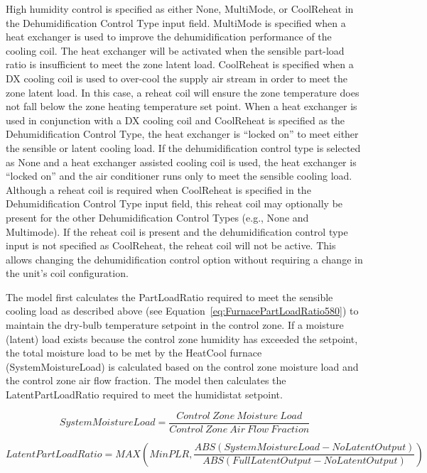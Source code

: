 High humidity control is specified as either None, MultiMode, or CoolReheat in the Dehumidification Control Type input field. MultiMode is specified when a heat exchanger is used to improve the dehumidification performance of the cooling coil. The heat exchanger will be activated when the sensible part-load ratio is insufficient to meet the zone latent load. CoolReheat is specified when a DX cooling coil is used to over-cool the supply air stream in order to meet the zone latent load. In this case, a reheat coil will ensure the zone temperature does not fall below the zone heating temperature set point. When a heat exchanger is used in conjunction with a DX cooling coil and CoolReheat is specified as the Dehumidification Control Type, the heat exchanger is ``locked on'' to meet either the sensible or latent cooling load. If the dehumidification control type is selected as None and a heat exchanger assisted cooling coil is used, the heat exchanger is ``locked on'' and the air conditioner runs only to meet the sensible cooling load. Although a reheat coil is required when CoolReheat is specified in the Dehumidification Control Type input field, this reheat coil may optionally be present for the other Dehumidification Control Types (e.g., None and Multimode). If the reheat coil is present and the dehumidification control type input is not specified as CoolReheat, the reheat coil will not be active. This allows changing the dehumidification control option without requiring a change in the unit's coil configuration.

The model first calculates the PartLoadRatio required to meet the sensible cooling load as described above (see Equation~\ref{eq:FurnacePartLoadRatio580}) to maintain the dry-bulb temperature setpoint in the control zone. If a moisture (latent) load exists because the control zone humidity has exceeded the setpoint, the total moisture load to be met by the HeatCool furnace (SystemMoistureLoad) is calculated based on the control zone moisture load and the control zone air flow fraction. The model then calculates the LatentPartLoadRatio required to meet the humidistat setpoint.

\begin{equation}
SystemMoistureLoad = \frac{{Control~Zone~Moisture~Load}}{{Control~Zone~Air~Flow~Fraction}}
\end{equation}

\begin{equation}
LatentPartLoadRatio = MAX\left( {MinPLR,\frac{{ABS\left( {SystemMoistureLoad - NoLatentOutput} \right)}}{{ABS\left( {FullLatentOutput - NoLatentOutput} \right)}}} \right)
\end{equation}


